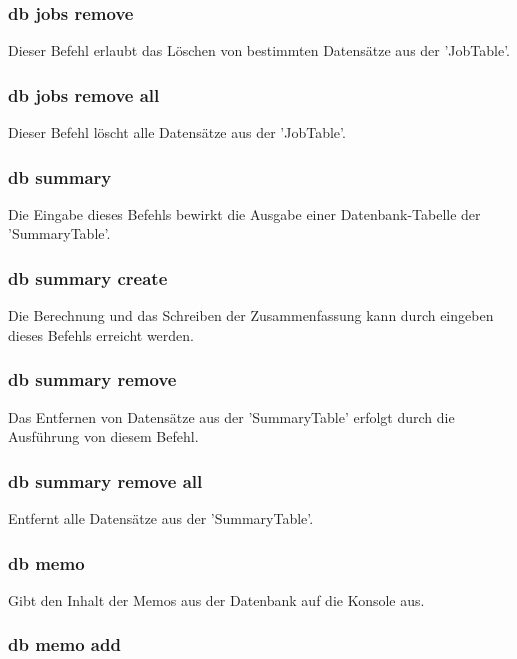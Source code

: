 \documentclass[12pt,a4paper]{report}
\begin{document}
\subsubsection{db jobs remove}

Dieser Befehl erlaubt das Löschen von bestimmten Datensätze aus der 'JobTable'.

\subsubsection{db jobs remove all}

Dieser Befehl löscht alle Datensätze aus der 'JobTable'.

\subsubsection{db summary}

Die Eingabe dieses Befehls bewirkt die Ausgabe einer Datenbank-Tabelle der 'SummaryTable'.

\subsubsection{db summary create}

Die Berechnung und das Schreiben der Zusammenfassung kann durch eingeben dieses Befehls erreicht werden.

\subsubsection{db summary remove}

Das Entfernen von Datensätze aus der 'SummaryTable' erfolgt durch die Ausführung von diesem Befehl.

\subsubsection{db summary remove all}

Entfernt alle Datensätze aus der 'SummaryTable'.

\subsubsection{db memo}

Gibt den Inhalt der Memos aus der Datenbank auf die Konsole aus.

\subsubsection{db memo add}
\end{document}
